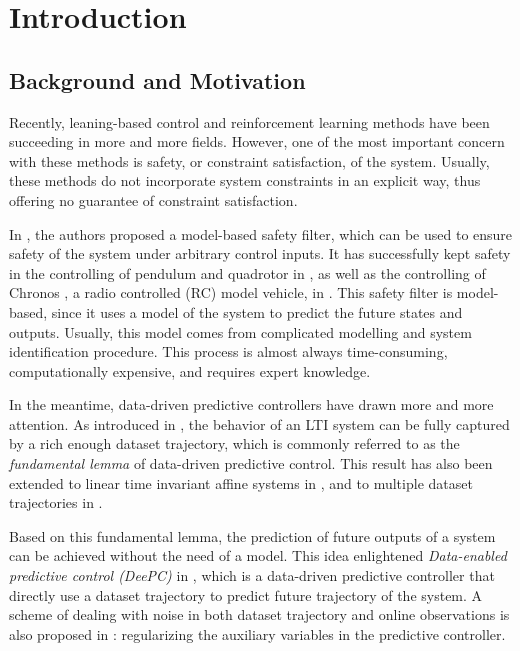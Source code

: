 \chapter{Introduction}\label{chap:introduction}


\section{Background and Motivation}\label{sec:motivation-and-background}

Recently, leaning-based control and reinforcement learning methods have been succeeding in more and more fields.
However, one of the most important concern with these methods is safety, or constraint satisfaction, of the system.
Usually, these methods do not incorporate system constraints in an explicit way, thus offering no guarantee of constraint satisfaction.

In \cite{wabersichPredictiveSafetyFilter2021a}, the authors proposed a model-based safety filter, which can be used to ensure safety of the system under arbitrary control inputs.
It has successfully kept safety in the controlling of pendulum and quadrotor in \cite{wabersichPredictiveSafetyFilter2021a}, as well as the controlling of Chronos \cite{carronChronosCRSDesign2022}, a radio controlled (RC) model vehicle, in \cite{tearlePredictiveSafetyFilterRacing2021}.
This safety filter is model-based, since it uses a model of the system to predict the future states and outputs.
Usually, this model comes from complicated modelling and system identification procedure.
This process is almost always time-consuming, computationally expensive, and requires expert knowledge.

In the meantime, data-driven predictive controllers have drawn more and more attention.
As introduced in \cite{willemsNotePersistencyExcitation2005}, the behavior of an LTI system can be fully captured by a rich enough dataset trajectory, which is commonly referred to as the \emph{fundamental lemma} of data-driven predictive control.
This result has also been extended to linear time invariant affine systems in \cite{martinelliDataDrivenAffine2022}, and to multiple dataset trajectories in \cite{vanwaardeMultiple2020}.

Based on this fundamental lemma, the prediction of future outputs of a system can be achieved without the need of a model.
This idea enlightened \emph{Data-enabled predictive control (DeePC)} in \cite{coulsonDataenabledPredictiveControl2019}, which is a data-driven predictive controller that directly use a dataset trajectory to predict future trajectory of the system.
A scheme of dealing with noise in both dataset trajectory and online observations is also proposed in \cite{coulsonDataenabledPredictiveControl2019}: regularizing the auxiliary variables in the predictive controller.

